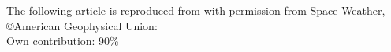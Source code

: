 
\newpage

The following article is reproduced from \textcite{Forstner-2019-tracking-validating} with permission from Space 
Weather, \copyright American Geophysical Union:\\

\hfill Own contribution: 90\%


